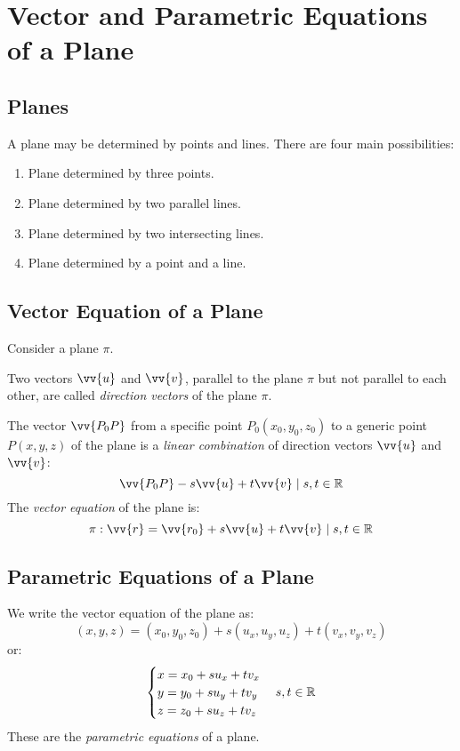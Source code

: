 \section{Vector and Parametric Equations of a Plane}
\subsection{Planes}
	A plane may be determined by points and lines.
	There are four main possibilities:
	\begin{enumerate}
		\item Plane determined by three points.
		\item Plane determined by two parallel lines.
		\item Plane determined by two intersecting lines.
		\item Plane determined by a point and a line.
	\end{enumerate}
\subsection{Vector Equation of a Plane}
	Consider a plane $\pi$.

	Two vectors $\vv{u}$ and $\vv{v}$, parallel to the plane $\pi$ but not parallel to each other, are called \emph{direction vectors} of the plane $\pi$.

	The vector $\vv{P_0P}$ from a specific point $P_0(x_0,y_0,z_0)$ to a generic point $P(x,y,z)$ of the plane is a \emph{linear combination} of direction vectors $\vv{u}$ and $\vv{v}$:
	\[\vv{P_0P} - s\vv{u} + t\vv{v} \such s, t \in \real\]
	The \emph{vector equation} of the plane is:
	\[\pi: \vv{r} = \vv{r_0} + s\vv{u} + t\vv{v} \such s, t \in \real\]
\subsection{Parametric Equations of a Plane}
	We write the vector equation of the plane as:
	\[(x,y,z) = (x_0,y_0,z_0) + s(u_x,u_y,u_z) + t(v_x,v_y,v_z)\]
	or:
	\begin{equation*}
		\begin{cases}
			x = x_0 + su_x + tv_x\\
			y = y_0 + su_y + tv_y\\
			z = z_0 + su_z + tv_z
		\end{cases}
		s, t \in \mathbb{R}
	\end{equation*}
	These are the \emph{parametric equations} of a plane.
